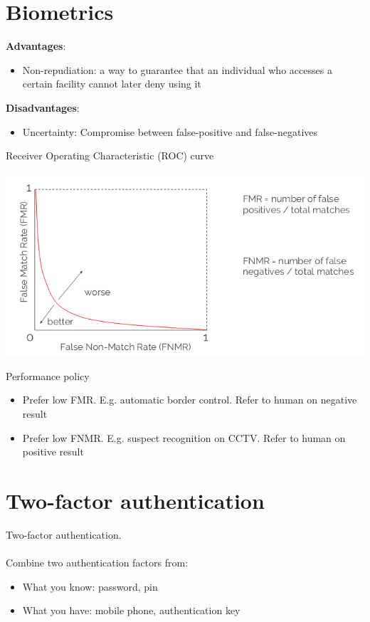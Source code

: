 \documentclass{article}[18pt]
\begin{document}
\section{Biometrics}
\textbf{Advantages}:
\begin{itemize}
	\item Non-repudiation: a way to guarantee that an individual who accesses a certain facility cannot later deny using it
\end{itemize}
\textbf{Disadvantages}:
\begin{itemize}
	\item Uncertainty: Compromise between false-positive and false-negatives
\end{itemize}
Receiver Operating Characteristic (ROC) curve
\begin{center}
	\includegraphics[scale=0.7]{ROC}
\end{center}
Performance policy
\begin{itemize}
	\item Prefer low FMR. E.g. automatic border control. Refer to human on negative result
	\item Prefer low FNMR. E.g. suspect recognition on CCTV. Refer to human on positive result
\end{itemize}
\section{Two-factor authentication}
Two-factor authentication.\\
\\
Combine two authentication factors from:
\begin{itemize}
	\item What you know: password, pin
	\item What you have: mobile phone, authentication key
\end{itemize}
\end{document}
